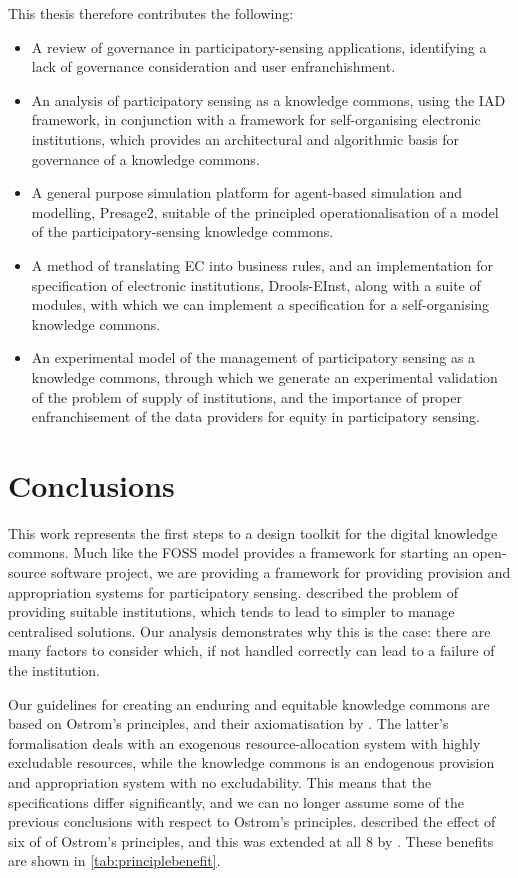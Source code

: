 This thesis therefore contributes the following:

\begin{itemize}
\item A review of governance in participatory-sensing applications, identifying a lack of governance consideration and user enfranchishment.
\item An analysis of participatory sensing as a knowledge commons, using the \ac{IAD} framework, in conjunction with a framework for self-organising electronic institutions, which provides an architectural and algorithmic basis for governance of a knowledge commons.
\item A general purpose simulation platform for agent-based simulation and modelling, Presage2, suitable of the principled operationalisation of a model of the participatory-sensing knowledge commons.
\item A method of translating \acl{EC} into business rules, and an implementation for specification of electronic institutions, Drools-EInst, along with a suite of modules, with which we can implement a specification for a self-organising knowledge commons.
\item An experimental model of the management of participatory sensing as a knowledge commons, through which we generate an experimental validation of the problem of supply of institutions, and the importance of proper enfranchisement of the data providers for equity in participatory sensing.
\end{itemize}

\section{Conclusions}

This work represents the first steps to a design toolkit for the digital
knowledge commons. Much like the \ac{FOSS} model provides a framework for
starting an open-source software project, we are providing a framework for
providing provision and appropriation systems for participatory sensing.
\citet{Ostrom1990} described the problem of providing suitable institutions,
which tends to lead to simpler to manage centralised solutions. Our analysis
demonstrates why this is the case: there are many factors to consider which,
if not handled correctly can lead to a failure of the institution.

Our guidelines for creating an enduring and equitable knowledge commons are
based on Ostrom's principles, and their axiomatisation by \citet{Pitt2012b}.
The latter's formalisation deals with an exogenous resource-allocation system
with highly excludable resources, while the knowledge commons is an
endogenous provision and appropriation system with no excludability. This
means that the specifications differ significantly, and we can no longer
assume some of the previous conclusions with respect to Ostrom's principles.
\citet{Pitt2012b} described the effect of six of of Ostrom's principles, and this was extended at all 8 by \citet{Schaumeier2013}. These benefits are shown in \autoref{tab:principlebenefit}.

